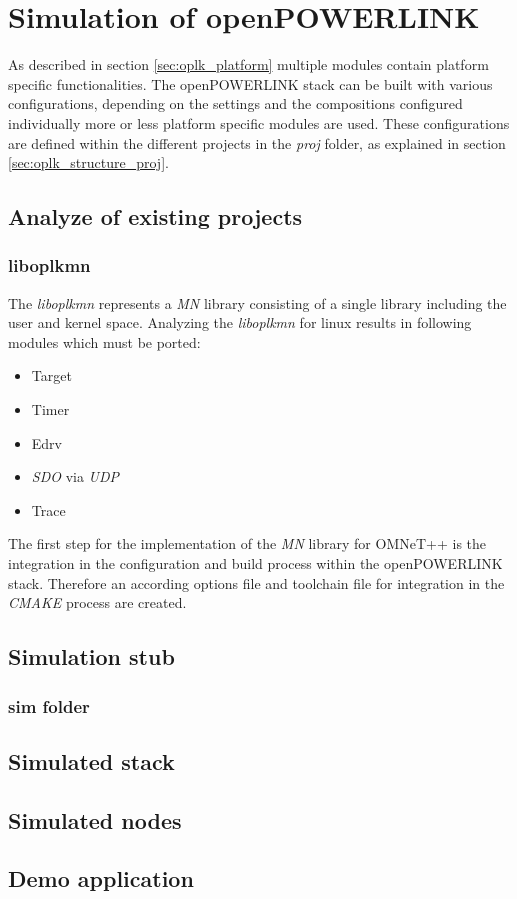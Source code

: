 \chapter{Simulation of openPOWERLINK}
\label{cha:porting}

As described in section \ref{sec:oplk_platform} multiple modules contain platform specific functionalities.
The openPOWERLINK stack can be built with various configurations, depending on the settings and the compositions configured individually more or less platform specific modules are used.
These configurations are defined within the different projects in the \emph{proj} folder, as explained in section \ref{sec:oplk_structure_proj}.

\section{Analyze of existing projects}
\label{sec:porting_projects}

\subsection{liboplkmn}
\label{sec:porting_projects_liboplkmn}

The \emph{liboplkmn} represents a \emph{MN} library consisting of a single library including the user and kernel space.
Analyzing the \emph{liboplkmn} for linux results in following modules which must be ported:

\begin{itemize}
    \item Target
    \item Timer
    \item Edrv
    \item \emph{SDO} via \emph{UDP}
    \item Trace
\end{itemize}

The first step for the implementation of the \emph{MN} library for OMNeT++ is the integration in the configuration and build process within the openPOWERLINK stack.
Therefore an according options file and toolchain file for integration in the \emph{CMAKE} process are created.

\section{Simulation stub}
\label{sec:porting_simstub}

\subsection{sim folder}
\label{sec:porting_simstub_sim}

\section{Simulated stack}
\label{sec:porting_stack}

\section{Simulated nodes}
\label{sec:porting_nodes}

\section{Demo application}
\label{sec:porting_demo}
